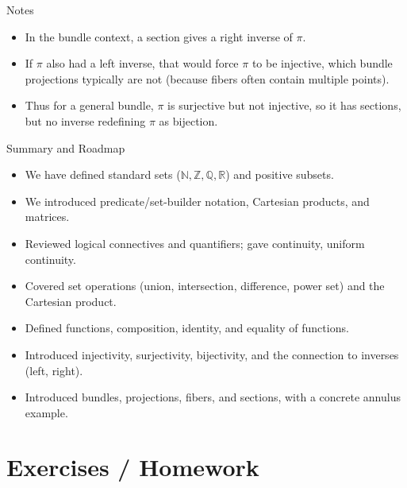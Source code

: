 \begin{frame}{Notes}
\begin{itemize}
    \item In the bundle context, a section gives a right inverse of \(\pi\).  
    \item If \(\pi\) also had a left inverse, that would force \(\pi\) to be injective, which bundle projections typically are not (because fibers often contain multiple points).
    \item Thus for a general bundle, \(\pi\) is surjective but not injective, so it has sections, but no inverse redefining \(\pi\) as bijection.
\end{itemize}

\end{frame}

\begin{frame}{Summary and Roadmap}
\begin{itemize}
  \item We have defined standard sets (\(\mathbb{N},\mathbb{Z},\mathbb{Q},\mathbb{R}\)) and positive subsets.
  \item We introduced predicate/set-builder notation, Cartesian products, and matrices.
  \item Reviewed logical connectives and quantifiers; gave continuity, uniform continuity.
  \item Covered set operations (union, intersection, difference, power set) and the Cartesian product.
  \item Defined functions, composition, identity, and equality of functions.
  \item Introduced injectivity, surjectivity, bijectivity, and the connection to inverses (left, right).
  \item Introduced bundles, projections, fibers, and sections, with a concrete annulus example.
\end{itemize}

\end{frame}

\section{Exercises / Homework}

